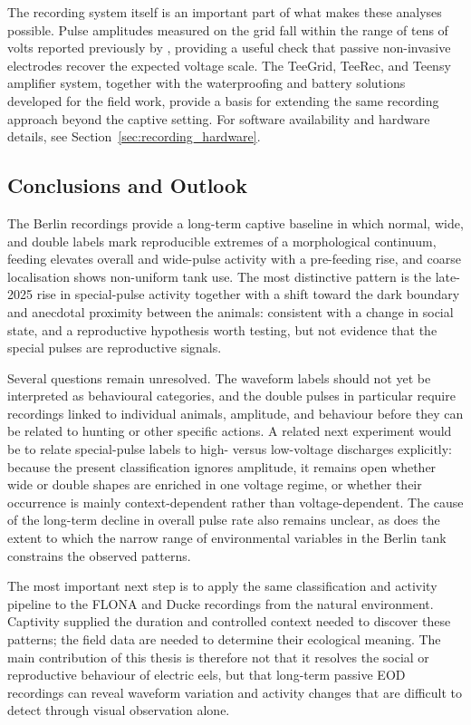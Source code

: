 The recording system itself is an important part of what makes these analyses possible. 
Pulse amplitudes measured on the grid fall within the range of tens of volts reported previously by \textcite{xu2021third}, providing a useful check that passive non-invasive electrodes recover the expected voltage scale. 
The TeeGrid, TeeRec, and Teensy amplifier system, together with the waterproofing and battery solutions developed for the field work, provide a basis for extending the same recording approach beyond the captive setting.
For software availability and hardware details, see Section~\ref{sec:recording_hardware}.

\subsection{Conclusions and Outlook}

The Berlin recordings provide a long-term captive baseline in which normal, wide, and double labels mark reproducible extremes of a morphological continuum, feeding elevates overall and wide-pulse activity with a pre-feeding rise, and coarse localisation shows non-uniform tank use.
The most distinctive pattern is the late-2025 rise in special-pulse activity together with a shift toward the dark boundary and anecdotal proximity between the animals: consistent with a change in social state, and a reproductive hypothesis worth testing, but not evidence that the special pulses are reproductive signals.

Several questions remain unresolved. 
The waveform labels should not yet be interpreted as behavioural categories, and the double pulses in particular require recordings linked to individual animals, amplitude, and behaviour before they can be related to hunting or other specific actions. 
A related next experiment would be to relate special-pulse labels to high- versus low-voltage discharges explicitly: because the present classification ignores amplitude, it remains open whether wide or double shapes are enriched in one voltage regime, or whether their occurrence is mainly context-dependent rather than voltage-dependent. 
The cause of the long-term decline in overall pulse rate also remains unclear, as does the extent to which the narrow range of environmental variables in the Berlin tank constrains the observed patterns.

The most important next step is to apply the same classification and activity pipeline to the FLONA and Ducke recordings from the natural environment.
Captivity supplied the duration and controlled context needed to discover these patterns; the field data are needed to determine their ecological meaning.
The main contribution of this thesis is therefore not that it resolves the social or reproductive behaviour of electric eels, but that long-term passive EOD recordings can reveal waveform variation and activity changes that are difficult to detect through visual observation alone.
